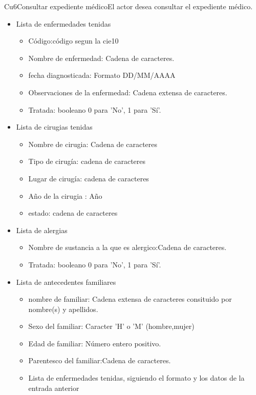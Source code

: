 \begin{UseCase}{Cu6}{Consultar expediente médico}{El actor desea consultar el expediente médico.}
{\begin{itemize}
\begin{itemize}
		\end{itemize}
         
       \item Lista de enfermedades tenidas
        \begin{itemize}
            \item Código:código segun la cie10
            \item Nombre de enfermedad: Cadena de caracteres. 
            \item fecha diagnosticada: Formato DD/MM/AAAA
            \item Observaciones de la enfermedad: Cadena extensa de caracteres.
            \item Tratada: booleano 0 para 'No', 1 para 'Sí'.

        \end{itemize}
        
        \item Lista de cirugias tenidas
        \begin{itemize}
            \item Nombre de cirugia: Cadena de caracteres
            \item Tipo de cirugía: cadena de caracteres
            \item Lugar de cirugía: cadena de caracteres
            \item Año de la cirugia : Año 
            \item estado: cadena de caracteres
        \end{itemize}
        
        \item Lista de alergias
        \begin{itemize}
            \item Nombre de sustancia a la que es alergico:Cadena de caracteres.
            \item Tratada: booleano 0 para 'No', 1 para 'Sí'.
        \end{itemize}
        
  \item Lista de antecedentes familiares
        
        \begin{itemize}
            \item nombre de familiar: Cadena extensa de caracteres consituido por nombre(s) y apellidos.
            \item Sexo del familiar: Caracter 'H' o 'M' (hombre,mujer)
            \item Edad de familiar: Número entero positivo.
            \item Parentesco del familiar:Cadena de caracteres.
            \item Lista de enfermedades tenidas, siguiendo el formato y los datos de la entrada anterior


\end{itemize}
\end{itemize}}
\end{UseCase}
